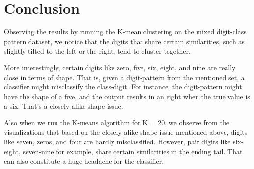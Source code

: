 \documentclass{article}
\begin{document}
\section{Conclusion}

Observing the results by running the K-mean clustering on the mixed digit-class pattern dataset, we notice that the digits that share certain similarities, such as slightly tilted to the left or the right, tend to cluster together.

More interestingly, certain digits like zero, five, six, eight, and nine are really close in terms of shape. That is, given a digit-pattern from the mentioned set, a classifier might misclassify the class-digit. For instance, the digit-pattern might have the shape of a five, and the output results in an eight when the true value is a six. That's a closely-alike shape issue.

Also when we run the K-means algorithm for K = 20, we observe from the visualizations that based on the closely-alike shape issue mentioned above, digits like seven, zeros, and four are hardly misclassified. However, pair digits like six-eight, seven-nine for example, share certain similarities in the ending tail. That can also constitute a huge headache for the classifier.
\end{document}
